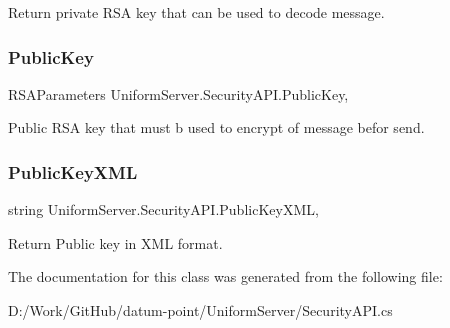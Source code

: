 Return private R\+SA key that can be used to decode message. 

\mbox{\label{class_uniform_server_1_1_security_a_p_i_a0760e6025414a7cb1e19528fe8c4697d}} 
\subsubsection{\texorpdfstring{Public\+Key}{PublicKey}}
{\footnotesize\ttfamily R\+S\+A\+Parameters Uniform\+Server.\+Security\+A\+P\+I.\+Public\+Key\hspace{0.3cm}{\ttfamily [static]}, {\ttfamily [get]}}



Public R\+SA key that must b used to encrypt of message befor send. 

\mbox{\label{class_uniform_server_1_1_security_a_p_i_a79bddf5d4d9a983f35629d2af14c1118}} 
\subsubsection{\texorpdfstring{Public\+Key\+X\+ML}{PublicKeyXML}}
{\footnotesize\ttfamily string Uniform\+Server.\+Security\+A\+P\+I.\+Public\+Key\+X\+ML\hspace{0.3cm}{\ttfamily [static]}, {\ttfamily [get]}}



Return Public key in X\+ML format. 



The documentation for this class was generated from the following file\+:\begin{DoxyCompactItemize}
\item 
D\+:/\+Work/\+Git\+Hub/datum-\/point/\+Uniform\+Server/Security\+A\+P\+I.\+cs\end{DoxyCompactItemize}
